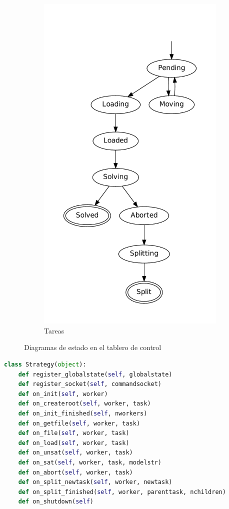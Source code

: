 \begin{figure}
\begin{subfigure}[b]{0.5\textwidth}
		\includegraphics[scale=0.5]{graphs/taskstates}
		\caption{Tareas}
	\end{subfigure}
	\caption{Diagramas de estado en el tablero de control}
\end{figure}

\begin{small}
\begin{lstlisting}[language=Python,caption=Interfaz Strategy]
class Strategy(object):
	def register_globalstate(self, globalstate)
	def register_socket(self, commandsocket)
	def on_init(self, worker)
	def on_createroot(self, worker, task)
	def on_init_finished(self, nworkers)
	def on_getfile(self, worker, task)
	def on_file(self, worker, task)
	def on_load(self, worker, task)
	def on_unsat(self, worker, task)
	def on_sat(self, worker, task, modelstr)
	def on_abort(self, worker, task)
	def on_split_newtask(self, worker, newtask)
	def on_split_finished(self, worker, parenttask, nchildren)
	def on_shutdown(self)
\end{lstlisting}
\end{small}


